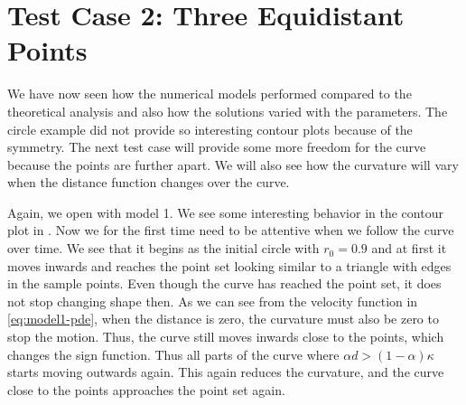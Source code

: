 \newpage
\section{Test Case 2: Three Equidistant Points}
We have now seen how the numerical models performed compared to the theoretical analysis and also how the solutions varied with the parameters. The circle example did not provide so interesting contour plots because of the symmetry. The next test case will provide some more freedom for the curve because the points are further apart. We will also see how the curvature will vary when the distance function changes over the curve.

Again, we open with model 1. We see some interesting behavior in the contour plot in . Now we for the first time need to be attentive when we follow the curve over time. We see that it begins as the initial circle with $r_0=0.9$ and at first it moves inwards and reaches the point set looking similar to a triangle with edges in the sample points. Even though the curve has reached the point set, it does not stop changing shape then. As we can see from the velocity function in \eqref{eq:model1-pde}, when the distance is zero, the curvature must also be zero to stop the motion. Thus, the curve still moves inwards close to the points, which changes the sign function. Thus all parts of the curve where $\alpha d > (1-\alpha)\kappa$ starts moving outwards again. This again reduces the curvature, and the curve close to the points approaches the point set again. 

